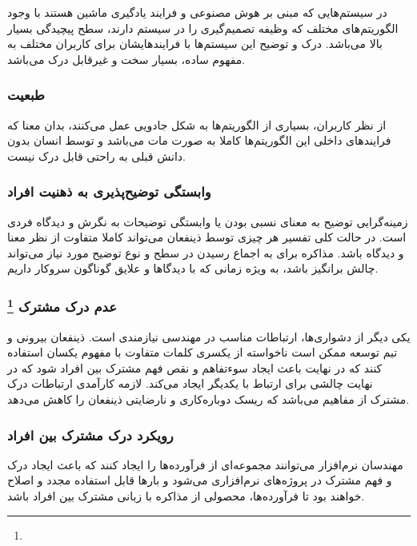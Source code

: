 در سیستم‌هایی که مبنی بر هوش مصنوعی و فرایند یادگیری ماشین هستند با وجود
الگوریتم‌های مختلف که وظیفه تصمیم‌گیری را در سیستم دارند، سطح پیچیدگی بسیار بالا
می‌باشد. درک و توضیح این سیستم‌ها با فرایند‌هایشان برای کاربران مختلف به مفهوم
ساده، بسیار سخت و غیرقابل درک می‌باشد.

\subsubsection{طبعیت }

از نظر کاربران، بسیاری از الگوریتم‌ها به شکل جادویی عمل می‌کنند، بدان معنا که
فرایند‌های داخلی این الگوریتم‌ها کاملا به صورت مات می‌باشد و توسط انسان بدون
دانش قبلی به راحتی قابل درک نیست.

\subsubsection{وابستگی توضیح‌پذیری به ذهنیت افراد }

زمینه‌گرایی توضیح به معنای نسبی بودن یا وابستگی توضیحات به نگرش و دیدگاه فردی
است. در حالت کلی تفسیر هر چیزی توسط ذینفعان می‌تواند کاملا متفاوت از نظر معنا و
دیدگاه باشد. مذاکره برای به اجماع رسیدن در سطح و نوع توضیح مورد نیاز می‌تواند
چالش برانگیز باشد، به ویژه زمانی که با دیدگاها و علایق گوناگون سروکار داریم.

\subsubsection*{عدم درک مشترک \footnote{}}

یکی دیگر از دشواری‌ها، ارتباطات مناسب در مهندسی نیازمندی است. ذینفعان بیرونی و
تیم توسعه ممکن است ناخواسته از یکسری کلمات متفاوت با مفهوم یکسان استفاده کنند که
در نهایت باعث ایجاد سوء‌تفاهم و نقص فهم مشترک بین افراد شود که در نهایت چالشی
برای ارتباط با یکدیگر ایجاد می‌کند. لازمه کارآمدی ارتباطات درک مشترک از مفاهیم
می‌باشد که ریسک دوباره‌کاری و نارضایتی ذینفعان را کاهش می‌دهد.

\subsubsection*{رویکرد درک مشترک بین افراد}

مهندسان نرم‌افزار می‌توانند مجموعه‌ای از فرآورده‌ها را ایجاد کنند که باعث ایجاد
درک و فهم مشترک در پروژه‌های نرم‌افزاری می‌شود و بار‌ها قابل استفاده مجدد و
اصلاح خواهند بود تا فرآورده‌ها، محصولی از مذاکره با زبانی مشترک بین افراد باشد.


